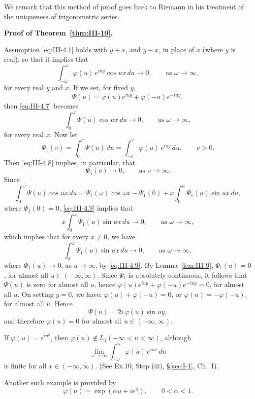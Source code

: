 We remark that this method of proof goes back to Riemann in his treatment of the uniqueness of trigonometric series.

\noindent\textbf{Proof of Theorem~\ref{thm:III-10}.}

Assumption \eqref{eq:III-4.1} holds with $y+x$, and $y-x$, in place of $x$ (where $y$ is real), so that it implies that
\begin{equation}\tag{4.7}\label{eq:III-4.7}
\int_{-\omega}^{\omega}\varphi(u)\,e^{iuy}\cos ux\,du\to0,\qquad\text{as }\omega\to\infty,
\end{equation}
for every real $y$ and $x$. If we set, for fixed $y$,
\[
\Psi(u)=\varphi(u)e^{iuy}+\varphi(-u)e^{-iuy},
\]
then \eqref{eq:III-4.7} becomes
\begin{equation}\tag{4.8}\label{eq:III-4.8}
\int_{0}^{\omega}\Psi(u)\cos ux\,du\to0,\qquad\text{as }\omega\to\infty,
\end{equation}
for every real $x$. Now let
\[
\Psi_{1}(v)=\int_{0}^{v}\Psi(u)\,du=\int_{-v}^{v}\varphi(u)\,e^{iuy}\,du,\qquad v>0.
\]
Then \eqref{eq:III-4.8} implies, in particular, that
\begin{equation}\tag{4.9}\label{eq:III-4.9}
\Psi_{1}(v)\to0,\qquad\text{as }v\to\infty.
\end{equation}
Since
\[
\int_{0}^{\omega}\Psi(u)\cos ux\,du
=\Psi_{1}(\omega)\cos\omega x-\Psi_{1}(0)+x\int_{0}^{\omega}\Psi_{1}(u)\sin ux\,du,
\]
where $\Psi_{1}(0)=0$, \eqref{eq:III-4.9} implies that
\[
x\int_{0}^{\omega}\Psi_{1}(u)\sin ux\,du\to0,\qquad\text{as }\omega\to\infty,
\]
which implies that for every $x\neq0$, we have
\[
\int_{0}^{\omega}\Psi_{1}(u)\sin ux\,du\to0,\qquad\text{as }\omega\to\infty,
\]
where $\Psi_{1}(u)\to0$, as $u\to\infty$, by \eqref{eq:III-4.9}. By Lemma~\ref{lem:III-9}, $\Psi_{1}(u)=0$, for almost all $u\in(-\infty,\infty)$. Since $\Psi_{1}$ is absolutely continuous, it follows that $\Psi(u)$ is zero for almost all $u$, hence $\varphi(u)e^{iuy}+\varphi(-u)e^{-iuy}=0$, for almost all $u$. On setting $y=0$, we have: $\varphi(u)+\varphi(-u)=0$, or $\varphi(u)=-\varphi(-u)$, for almost all $u$. Hence
\[
\Psi(u)=2i\,\varphi(u)\sin uy,
\]
and therefore $\varphi(u)=0$ for almost all $u\in(-\infty,\infty)$.

\begin{remark}\label{rem:III-1}
If $\varphi(u)=e^{iu^{2}}$, then $\varphi(u)\notin L_{1}(-\infty<u<\infty)$, although
\[
\lim_{\omega\to\infty}\int_{-\omega}^{\omega}\varphi(u)\,e^{iux}\,du
\]
is finite for all $x\in(-\infty,\infty)$. (See Ex.10, Step (iii), \S\ref{sec:I-1}, Ch.~I).

Another such example is provided by
\[
\varphi(u)=\exp(\alpha u+ie^{u}),\qquad0<\alpha<1.
\]
\end{remark}
